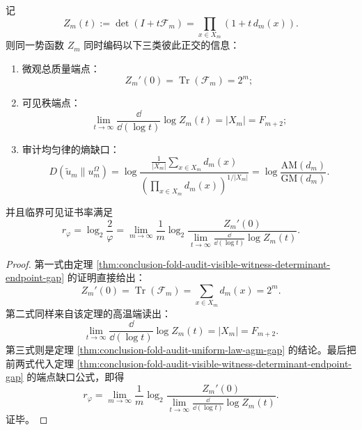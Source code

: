 \begin{theorem}[单一行列式势的三端点刚性]\label{thm:conclusion-single-determinant-potential-three-endpoint-rigidity}
记
\[
Z_m(t):=\det(I+t\mathcal F_m)=\prod_{x\in X_m}(1+t\,d_m(x)).
\]
则同一势函数 \(Z_m\) 同时编码以下三类彼此正交的信息：
\begin{enumerate}
\normalfont
  \item 微观总质量端点：
  \[
  Z_m'(0)=\operatorname{Tr}(\mathcal F_m)=2^m;
  \]
  \item 可见秩端点：
  \[
  \lim_{t\to\infty}\frac{\dd}{\dd(\log t)}\log Z_m(t)=|X_m|=F_{m+2};
  \]
  \item 审计均匀律的熵缺口：
  \[
  D(\widetilde u_m\|u_m^\Omega)
  =
  \log\frac{\frac1{|X_m|}\sum_{x\in X_m}d_m(x)}
  {\left(\prod_{x\in X_m}d_m(x)\right)^{1/|X_m|}}
  =
  \log\frac{\mathrm{AM}(d_m)}{\mathrm{GM}(d_m)}.
  \]
\end{enumerate}
并且临界可见证书率满足
\[
r_\varphi
=
\log_2\frac{2}{\varphi}
=
\lim_{m\to\infty}
\frac1m\log_2
\frac{Z_m'(0)}
{\displaystyle \lim_{t\to\infty}\frac{\dd}{\dd(\log t)}\log Z_m(t)}.
\]
\end{theorem}
\begin{proof}
第一式由定理 \ref{thm:conclusion-fold-audit-visible-witness-determinant-endpoint-gap} 的证明直接给出：
\[
Z_m'(0)=\operatorname{Tr}(\mathcal F_m)=\sum_{x\in X_m}d_m(x)=2^m.
\]
第二式同样来自该定理的高温端读出：
\[
\lim_{t\to\infty}\frac{\dd}{\dd(\log t)}\log Z_m(t)=|X_m|=F_{m+2}.
\]
第三式则是定理 \ref{thm:conclusion-fold-audit-uniform-law-agm-gap} 的结论。最后把前两式代入定理 \ref{thm:conclusion-fold-audit-visible-witness-determinant-endpoint-gap} 的端点缺口公式，即得
\[
r_\varphi
=
\lim_{m\to\infty}
\frac1m\log_2
\frac{Z_m'(0)}
{\displaystyle \lim_{t\to\infty}\frac{\dd}{\dd(\log t)}\log Z_m(t)}.
\]
证毕。
\end{proof}

